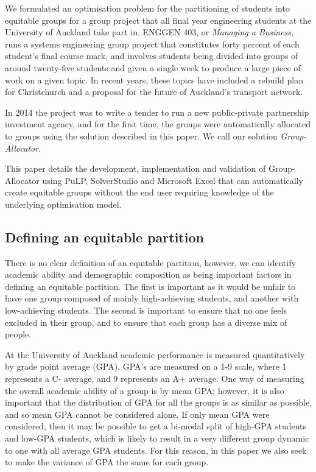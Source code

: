 \documentclass[12pt]{ORSNZ}
\begin{document}
We formulated an optimisation problem for the partitioning of students into equitable groups for a group project that all final year engineering students at the University of Auckland take part in. ENGGEN 403, or \emph{Managing a Business}, runs a systems engineering group project that constitutes forty percent of each student's final course mark, and involves students being divided into groups of around twenty-five students and given a single week to produce a large piece of work on a given topic. In recent years, these topics have included a rebuild plan for Christchurch and a proposal for the future of Auckland's transport network.

In 2014 the project was to write a tender to run a new public-private partnership investment agency, and for the first time, the groups were automatically allocated to groups using the solution described in this paper. We call our solution \emph{Group-Allocator}.

This paper details the development, implementation and validation of Group-Allocator using PuLP, SolverStudio and Microsoft Excel that can automatically create equitable groups without the end user requiring knowledge of the underlying optimisation model.

\subsection{Defining an equitable partition}
There is no clear definition of an equitable partition, however, we can identify academic ability and demographic composition as being important factors in defining an equitable partition. The first is important as it would be unfair to have one group composed of mainly high-achieving students, and another with low-achieving students. The second is important to ensure that no one feels excluded in their group, and to ensure that each group has a diverse mix of people.

At the University of Auckland academic performance is measured quantitatively by grade point average (GPA). GPA's are measured on a 1-9 scale, where 1 represents a C- average, and 9 represents an A+ average. One way of measuring the overall academic ability of a group is by mean GPA; however, it is also important that the distribution of GPA for all the groups is as similar as possible, and so mean GPA cannot be considered alone. If only mean GPA were considered, then it may be possible to get a bi-modal split of high-GPA students and low-GPA students, which is likely to result in a very different group dynamic to one with all average GPA students. For this reason, in this paper we also seek to make the variance of GPA the same for each group. 
\end{document}
